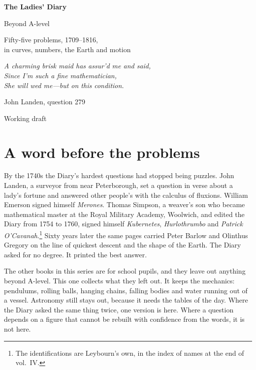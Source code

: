 \documentclass[11pt,a4paper]{article}
\newcounter{prob}
\begin{document}
\begin{titlepage}
\centering
\vspace*{3cm}
{\Huge\bfseries The Ladies' Diary\par}
\vspace{0.4cm}
{\LARGE Beyond A-level\par}
\vspace{0.8cm}
{\Large Fifty-five problems, 1709--1816,\\ in curves, numbers, the Earth and motion\par}
\vspace{2cm}
{\large\itshape A charming brisk maid has assur'd me and said,\\
Since I'm such a fine mathematician,\\
She will wed me---but on this condition.\par}
\vspace{0.3cm}
{\small John Landen, question 279\par}
\vfill
{\large Working draft\par}
\end{titlepage}

\section*{A word before the problems}

By the 1740s the Diary's hardest questions had stopped being puzzles. John Landen, a
surveyor from near Peterborough, set a question in verse about a lady's fortune and answered
other people's with the calculus of fluxions. William Emerson signed himself
\textit{Merones}. Thomas Simpson, a weaver's son who became mathematical master at the
Royal Military Academy, Woolwich, and edited the Diary from 1754 to 1760, signed himself \textit{Kubernetes}, \textit{Hurlothrumbo} and \textit{Patrick
O'Cavanah}.\footnote{The identifications are Leybourn's own, in the index of names at the
end of vol.~IV.} Sixty years later the same pages carried Peter Barlow and Olinthus
Gregory on the line of quickest descent and the shape of the Earth. The Diary asked for no
degree. It printed the best answer.

The other books in this series are for school pupils, and they leave out anything
beyond A-level. This one collects what they left out. It keeps the mechanics:
pendulums, rolling balls, hanging chains, falling bodies and water running out of a
vessel. Astronomy still stays out, because it needs the tables of the day. Where the
Diary asked the same thing twice, one version is here. Where a question depends on a
figure that cannot be rebuilt with confidence from the words, it is not here.
\end{document}
